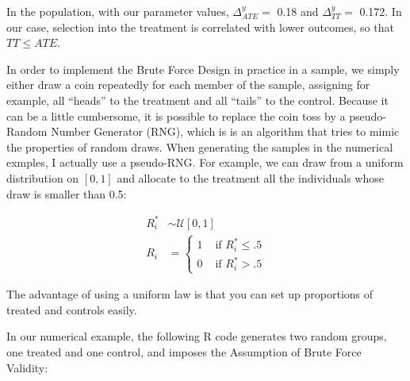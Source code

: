 \documentclass[]{book}
\newenvironment{Shaded}{\begin{snugshade}}{\end{snugshade}}
\newcommand{\KeywordTok}[1]{\textcolor[rgb]{0.13,0.29,0.53}{\textbf{#1}}}
\newcommand{\DecValTok}[1]{\textcolor[rgb]{0.00,0.00,0.81}{#1}}
\newcommand{\StringTok}[1]{\textcolor[rgb]{0.31,0.60,0.02}{#1}}
\newcommand{\CommentTok}[1]{\textcolor[rgb]{0.56,0.35,0.01}{\textit{#1}}}
\newcommand{\OperatorTok}[1]{\textcolor[rgb]{0.81,0.36,0.00}{\textbf{#1}}}
\newcommand{\NormalTok}[1]{#1}
\theoremstyle{definition}
\theoremstyle{definition}
\theoremstyle{definition}
\theoremstyle{remark}
\let\BeginKnitrBlock\begin \let\EndKnitrBlock\end
\begin{document}
In the population, with our parameter values, \(\Delta^y_{ATE}=\) 0.18
and \(\Delta^y_{TT}=\) 0.172. In our case, selection into the treatment
is correlated with lower outcomes, so that \(TT\leq ATE\).

In order to implement the Brute Force Design in practice in a sample, we
simply either draw a coin repeatedly for each member of the sample,
assigning for example, all ``heads'' to the treatment and all ``tails''
to the control. Because it can be a little cumbersome, it is possible to
replace the coin toss by a pseudo-Random Number Generator (RNG), which
is is an algorithm that tries to mimic the properties of random draws.
When generating the samples in the numerical exmples, I actually use a
pseudo-RNG. For example, we can draw from a uniform distribution on
\([0,1]\) and allocate to the treatment all the individuals whose draw
is smaller than 0.5:

\begin{align*}
  R_i^* & \sim \mathcal{U}[0,1]\\
  R_i & = 
  \begin{cases}
    1 & \text{ if } R_i^*\leq .5 \\
    0 & \text{ if } R_i^*> .5 
  \end{cases}
\end{align*}

The advantage of using a uniform law is that you can set up proportions
of treated and controls easily.

\BeginKnitrBlock{example}
\protect\hypertarget{exm:unnamed-chunk-68}{}{\label{exm:unnamed-chunk-68}
}In our numerical example, the following R code generates two random
groups, one treated and one control, and imposes the Assumption of Brute
Force Validity:
\EndKnitrBlock{example}

\begin{Shaded}
\end{Shaded}
\end{document}
